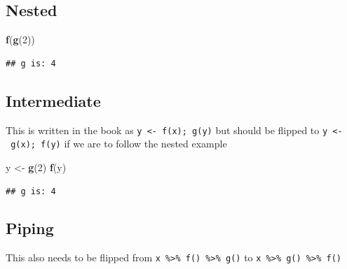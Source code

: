\documentclass[]{book}
\newenvironment{Shaded}{\begin{snugshade}}{\end{snugshade}}
\newcommand{\DecValTok}[1]{\textcolor[rgb]{0.00,0.00,0.81}{#1}}
\newcommand{\KeywordTok}[1]{\textcolor[rgb]{0.13,0.29,0.53}{\textbf{#1}}}
\newcommand{\NormalTok}[1]{#1}
\newcommand{\OperatorTok}[1]{\textcolor[rgb]{0.81,0.36,0.00}{\textbf{#1}}}
\newcommand{\StringTok}[1]{\textcolor[rgb]{0.31,0.60,0.02}{#1}}
\begin{document}
\hypertarget{nested}{%
\subsection{Nested}\label{nested}}

\begin{Shaded}
\begin{Highlighting}[]
\KeywordTok{f}\NormalTok{(}\KeywordTok{g}\NormalTok{(}\DecValTok{2}\NormalTok{))}
\end{Highlighting}
\end{Shaded}

\begin{verbatim}
## g is: 4
\end{verbatim}

\hypertarget{intermediate}{%
\subsection{Intermediate}\label{intermediate}}

This is written in the book as \texttt{y\ \textless{}-\ f(x);\ g(y)} but should be flipped to \texttt{y\ \textless{}-\ g(x);\ f(y)} if we are to follow the nested example

\begin{Shaded}
\begin{Highlighting}[]
\NormalTok{y <-}\StringTok{ }\KeywordTok{g}\NormalTok{(}\DecValTok{2}\NormalTok{)}
\KeywordTok{f}\NormalTok{(y)}
\end{Highlighting}
\end{Shaded}

\begin{verbatim}
## g is: 4
\end{verbatim}

\hypertarget{piping}{%
\subsection{Piping}\label{piping}}

This also needs to be flipped from \texttt{x\ \%\textgreater{}\%\ f()\ \%\textgreater{}\%\ g()} to \texttt{x\ \%\textgreater{}\%\ g()\ \%\textgreater{}\%\ f()}

\begin{Shaded}
\end{Shaded}
\end{document}
